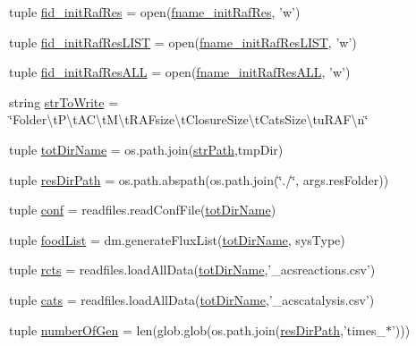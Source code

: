 \begin{DoxyCompactItemize}
\item 
tuple \hyperlink{a00111_a98d514a663f6bedde329d0bbbd2b78fa}{fid\-\_\-init\-Raf\-Res} = open(\hyperlink{a00111_a72ed3f9434cc4dcc2240c6ca408960ff}{fname\-\_\-init\-Raf\-Res}, 'w')
\item 
tuple \hyperlink{a00111_ae24c607a37f0f3f23d7e87f6bb4fe45b}{fid\-\_\-init\-Raf\-Res\-L\-I\-S\-T} = open(\hyperlink{a00111_adf05ced8171427a0ea7daf7e595f72b6}{fname\-\_\-init\-Raf\-Res\-L\-I\-S\-T}, 'w')
\item 
tuple \hyperlink{a00111_a45aeb03f0d9cc30cb0a490354fd76d6c}{fid\-\_\-init\-Raf\-Res\-A\-L\-L} = open(\hyperlink{a00111_a1b43b3b737d94a412b2334b78252cdef}{fname\-\_\-init\-Raf\-Res\-A\-L\-L}, 'w')
\item 
string \hyperlink{a00111_ab9980383a541b03ce91d6b812a4bf79a}{str\-To\-Write} = \char`\"{}Folder\textbackslash{}t\-P\textbackslash{}t\-A\-C\textbackslash{}t\-M\textbackslash{}t\-R\-A\-Fsize\textbackslash{}t\-Closure\-Size\textbackslash{}t\-Cats\-Size\textbackslash{}tu\-R\-A\-F\textbackslash{}n\char`\"{}
\item 
tuple \hyperlink{a00111_a82f73a786e4c93e909fd689ee0d0812e}{tot\-Dir\-Name} = os.\-path.\-join(\hyperlink{a00111_ac0b5b603b5f89c10838ce6a42be8c6f7}{str\-Path},tmp\-Dir)
\item 
tuple \hyperlink{a00111_a93d7d68ada532b3cedaab103283ab91a}{res\-Dir\-Path} = os.\-path.\-abspath(os.\-path.\-join(\char`\"{}./\char`\"{}, args.\-res\-Folder))
\item 
tuple \hyperlink{a00111_adc567db25548116293968a9102beab98}{conf} = readfiles.\-read\-Conf\-File(\hyperlink{a00111_a82f73a786e4c93e909fd689ee0d0812e}{tot\-Dir\-Name})
\item 
tuple \hyperlink{a00111_a07ce1f0750b6dc5baff89792fc194152}{food\-List} = dm.\-generate\-Flux\-List(\hyperlink{a00111_a82f73a786e4c93e909fd689ee0d0812e}{tot\-Dir\-Name}, sys\-Type)
\item 
tuple \hyperlink{a00111_ac2fe1ed3228b8e616f25ccfbe4cc7dc4}{rcts} = readfiles.\-load\-All\-Data(\hyperlink{a00111_a82f73a786e4c93e909fd689ee0d0812e}{tot\-Dir\-Name},'\-\_\-acsreactions.\-csv')
\item 
tuple \hyperlink{a00111_adc0282a6415a88834556e66807bcc800}{cats} = readfiles.\-load\-All\-Data(\hyperlink{a00111_a82f73a786e4c93e909fd689ee0d0812e}{tot\-Dir\-Name},'\-\_\-acscatalysis.\-csv')
\item 
tuple \hyperlink{a00111_aabf82b9e9c2293000a67162becdd440d}{number\-Of\-Gen} = len(glob.\-glob(os.\-path.\-join(\hyperlink{a00111_a93d7d68ada532b3cedaab103283ab91a}{res\-Dir\-Path},'times\-\_\-$\ast$')))

\end{DoxyCompactItemize}
